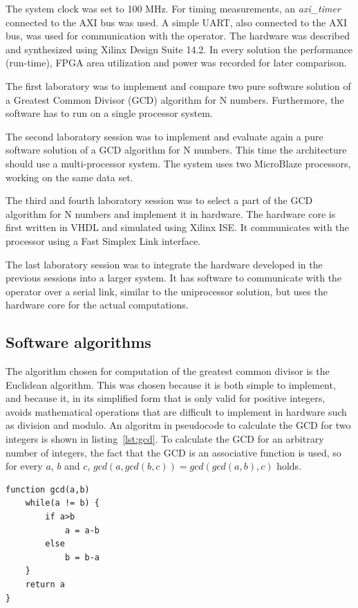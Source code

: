 \documentclass[11pt]{article}
\begin{document}
The system clock was set to 100 MHz. For timing measurements, an \emph{axi\_timer}\cite{axi-timer} connected to the AXI bus was used. A simple UART, also connected to the AXI bus, was used for communication with the operator. The hardware was described and synthesized using Xilinx Design Suite 14.2. In every solution the performance (run-time), FPGA area utilization and power was recorded for later comparison.

The first laboratory was to implement and compare two pure software solution of a Greatest Common Divisor (GCD) algorithm for N numbers. Furthermore, the software has to run on a single processor system.

The second laboratory session was to implement and evaluate again a pure software solution of a GCD algorithm for N numbers. This time the architecture should use a multi-processor system. The system uses two MicroBlaze processors, working on the same data set.

The third and fourth laboratory session was to select a part of the GCD algorithm for N numbers and implement it in hardware. The hardware core is first written in VHDL and simulated using Xilinx ISE. It communicates with the processor using a Fast Simplex Link interface\cite{fsl}.

The last laboratory session was to integrate the hardware developed in the previous sessions into a larger system. It has software to communicate with the operator over a serial link, similar to the uniprocessor solution, but uses the hardware core for the actual computations.

\subsection{Software algorithms}
The algorithm chosen for computation of the greatest common divisor is the Euclidean algorithm. This was chosen because it is both simple to implement, and because it, in its simplified form that is only valid for positive integers, avoids mathematical operations that are difficult to implement in hardware such as division and modulo. An algoritm in pseudocode to calculate the GCD for two integers\cite[pp. 318-320]{knuth} is shown in listing~\ref{lst:gcd}. To calculate the GCD for an arbitrary number of integers, the fact that the GCD is an associative function is used, so for every $a$, $b$ and $c$, $gcd(a, gcd(b, c)) = gcd(gcd(a, b), c)$ holds.

\begin{lstlisting}[float=tbh,frame=tb,captionpos=b,caption={Euclidean subtracion algorithm},label=lst:gcd]
function gcd(a,b)
	while(a != b) {
		if a>b
			a = a-b
		else
			b = b-a
	}
	return a
}
\end{lstlisting}
\end{document}
